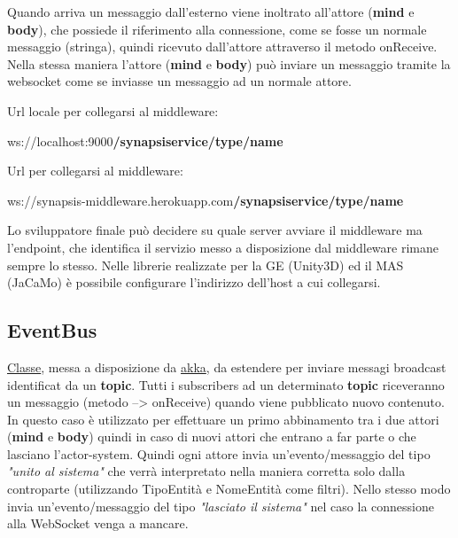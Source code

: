\medskip

Quando arriva un messaggio dall'esterno viene inoltrato all'attore (\textbf{mind} e \textbf{body}), che possiede il riferimento alla connessione, come se fosse un normale messaggio (stringa), quindi ricevuto dall'attore attraverso il metodo onReceive. Nella stessa maniera l'attore (\textbf{mind} e \textbf{body}) può inviare un messaggio tramite la websocket come se inviasse un messaggio ad un normale attore.

Url locale per collegarsi al middleware:

ws://localhost:9000\textbf{/synapsiservice/type/name}

Url per collegarsi al middleware:

ws://synapsis-middleware.herokuapp.com\textbf{/synapsiservice/type/name}

\medskip

Lo sviluppatore finale può decidere su quale server avviare il middleware ma l'endpoint, che identifica il servizio messo a disposizione dal middleware rimane sempre lo stesso. Nelle librerie realizzate per la GE (Unity3D) ed il MAS (JaCaMo) è possibile configurare l'indirizzo dell'host a cui collegarsi.

\medskip

\subsection{EventBus}
\href{https://doc.akka.io/docs/akka/current/event-bus.html}{Classe}, messa a disposizione da \href{https://akka.io/}{akka}, da estendere per inviare messagi broadcast identificat da un \textbf{topic}. Tutti i subscribers ad un determinato \textbf{topic} riceveranno un messaggio (metodo --> onReceive) quando viene pubblicato nuovo contenuto. In questo caso è utilizzato per effettuare un primo abbinamento tra i due attori (\textbf{mind} e \textbf{body}) quindi in caso di nuovi attori che entrano a far parte o che lasciano l'actor-system. Quindi ogni attore invia un'evento/messaggio del tipo \textit{"unito al sistema"} che verrà interpretato nella maniera corretta solo dalla controparte (utilizzando TipoEntità e NomeEntità come filtri). Nello stesso modo invia un'evento/messaggio del tipo \textit{"lasciato il sistema"} nel caso la connessione alla WebSocket venga a mancare.

\medskip

